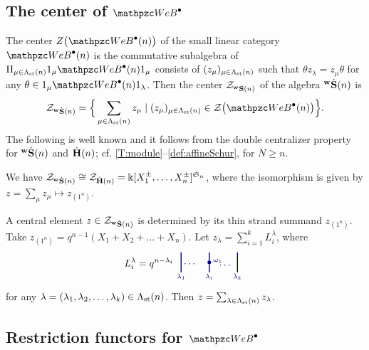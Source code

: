 \subsection{The center of $\qAW$}

The center $Z\big(\qAW(n)\big)$ of the small linear category $\qAW(n) $ is the commutative subalgebra of $\Pi_{\mu \in \Lambda_\st(n)} 1_\mu \qAW(n) 1_\mu$
consists of $(z_\mu)_{\mu\in \Lambda_{\text{st}}(n)}$ such that $\theta z_\lambda =z_\mu \theta
$ for any $ \theta\in 1_\mu \qAW(n)1_\lambda$.
Then the center $\mathcal{Z}_{{}^{\bold{w}}\dot{\bold{S}}(n)}$ of the algebra ${}^{\bold{w}}\dot{\bold{S}}(n)$ is 
  \[
  \cZ_{\hwS(n)}= \Big\{\sum_{\mu\in \Lambda_\st(n)}z_\mu\mid (z_\mu)_{\mu\in\Lambda_\st(n)}\in \cZ\big(\qAW(n)\big) \Big\}.
  \]
  The following is well known and it follows from the double centralizer property for ${}^{\bold{w}}\dot{\bold{S}}(n)$ and $\dot{\bf H}(n)$; cf. \eqref{T:module}--\eqref{def:affineSchur}, for $N\ge n$.
\begin{proposition}
\label{prop:center}
    We have $\mathcal{Z}_{{}^{\bold{w}}\dot{\bold{S}}(n)}\cong \mathcal{Z}_{\dot{\bf H}(n)}= \Bbbk[X_1^{\pm},\ldots,X_n^{\pm}]^{\mathfrak S_n}$, where the isomorphism is given by $z=\sum_\mu z_\mu \mapsto z_{(1^n)}$.
\end{proposition}

\begin{example}
    A central element $z \in \mathcal{Z}_{{}^{\bold{w}}\dot{\bold{S}}(n)}$ is determined by its thin strand summand $z_{(1^n)}$. Take 
$z_{(1^n)}=q^{n-1}(X_1+X_2+\ldots+ X_n)$. Let     $z_{\lambda}=\sum_{i=1}^kL^\lambda_i$, where    
    $$L^\lambda_i=  q^{n-\lambda_i} \begin{tikzpicture}[baseline = 3pt, scale=0.5, color=\clr]
\draw[-,line width=1pt] (-1,-.2) to (-1,1.2);
\node at (-1,-.5) {$\scriptstyle \lambda_1$};
\node at (-.4,.4) {$\ldots$};
\draw[-,line width=1pt] (1,-.2) to (1,1.2);
\draw(1,0.5) \bdot; \node at (1.6,0.6) {$\scriptstyle \omega_{1}$};
\node at (1,-.5) {$\scriptstyle \lambda_{i}$};
\node at (2.1,.3) {$\ldots$};
\draw[-,line width=1pt] (3,-.2) to (3,1.2);
\node at (3,-.5) {$\scriptstyle \lambda_k$};
\end{tikzpicture}  $$ 
for any $\lambda=(\lambda_1,\lambda_2,\ldots, \lambda_k)\in \Lambda_{\text{st}}(n)$.
Then $z=\sum _{\lambda\in\Lambda_{\text{st}}(n)}z_\lambda$.
\end{example}


\subsection{Restriction functors for $\qAW$}

